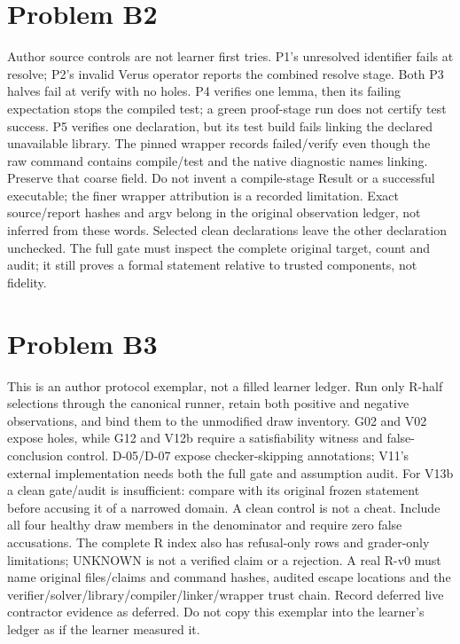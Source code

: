 \documentclass[11pt]{article}
\begin{document}
\section*{Problem B2}\label{ans:B2}
\begin{answer}
Author source controls are not learner first tries. P1's unresolved identifier
fails at resolve; P2's invalid Verus operator reports the combined resolve
stage. Both P3 halves fail at verify with no holes. P4 verifies one lemma,
then its failing expectation stops the compiled test; a green proof-stage
run does not certify test success. P5 verifies one declaration, but its test
build fails linking the declared unavailable library. The pinned wrapper
records failed/verify even though the raw command contains compile/test and
the native diagnostic names linking. Preserve that coarse field. Do not
invent a compile-stage Result or a successful executable; the finer wrapper
attribution is a recorded limitation. Exact source/report hashes and argv
belong in the original observation ledger, not inferred from these words.
Selected clean declarations leave the other declaration unchecked. The
full gate must inspect the complete original target, count and audit; it
still proves a formal statement relative to trusted components, not fidelity.
\end{answer}
\section*{Problem B3}\label{ans:B3}
\begin{answer}
This is an author protocol exemplar, not a filled learner ledger. Run only
R-half selections through the canonical runner, retain both positive and
negative observations, and bind them to the unmodified draw inventory.
G02 and V02 expose holes, while G12 and V12b require a satisfiability witness
and false-conclusion control. D-05/D-07 expose checker-skipping annotations;
V11's external implementation needs both the full gate and assumption audit.
For V13b a clean gate/audit is insufficient: compare with its original frozen
statement before accusing it of a narrowed domain. A clean control is not a
cheat. Include all four healthy draw members in the denominator and require
zero false accusations. The complete R index also has refusal-only rows and
grader-only limitations; UNKNOWN is not a verified claim or a rejection.
A real R-v0 must name original files/claims and command hashes, audited
escape locations and the verifier/solver/library/compiler/linker/wrapper
trust chain. Record deferred live contractor evidence as deferred. Do not
copy this exemplar into the learner's ledger as if the learner measured it.
\end{answer}
\end{document}

